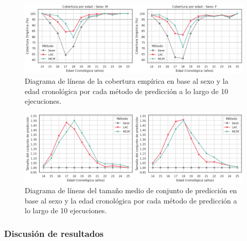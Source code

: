 \begin{figure}[h]
    \centering
    \includegraphics[width=\textwidth]{capitulos/cap_05/imagenes/AMM-linechart_EC_by_age_and_sex.png}
    \caption[
        Problema de estimación de mayoría de edad:
        Diagrama de líneas de la cobertura empírica en base al sexo y la edad cronológica por cada método de predicción a lo largo de 10 ejecuciones.
    ]{
        Diagrama de líneas de la cobertura empírica en base al sexo y la edad cronológica por cada método de predicción a lo largo de 10 ejecuciones.
    }
    \label{fig:AMM-linechart_EC_by_age_and_sex}
\end{figure}


\begin{figure}[h]
    \centering
    \includegraphics[width=\textwidth]{capitulos/cap_05/imagenes/AMM-linechart_MPSS_by_age_and_sex.png}
    \caption[
        Problema de estimación de mayoría de edad:
        Diagrama de líneas del tamaño medio de conjunto de predicción en base al sexo y la edad cronológica por cada método de predicción a lo largo de 10 ejecuciones.
    ]{
        Diagrama de líneas del tamaño medio de conjunto de predicción en base al sexo y la edad cronológica por cada método de predicción a lo largo de 10 ejecuciones.
    }
    \label{fig:AMM-linechart_MPSS_by_age_and_sex}
\end{figure}


\FloatBarrier


\subsubsection{Discusión de resultados}

